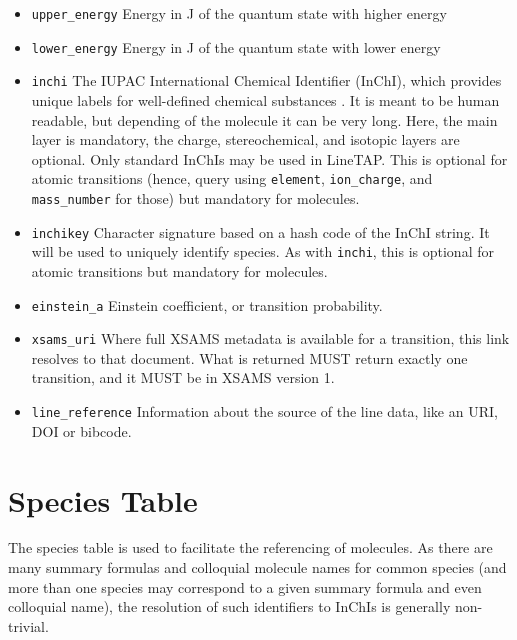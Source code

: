 \documentclass[11pt,a4paper]{ivoa}
\begin{document}
\begin{itemize}
\item \texttt{upper\_energy} Energy  in J of the quantum state
with higher energy

\item \texttt{lower\_energy} Energy  in J of the quantum state
with lower energy

\item \texttt{inchi} The IUPAC International Chemical Identifier
(InChI), which  provides unique labels for well-defined chemical
substances \citep{INCHI}. It is meant to be human readable, but
depending of the molecule it can be very long.  Here, the main layer is
mandatory, the charge, stereochemical, and isotopic layers are optional.
Only standard InChIs may be used in LineTAP.  This is optional for
atomic transitions (hence, query using \texttt{element},
\texttt{ion\_charge}, and \texttt{mass\_number} for those) but mandatory
for molecules.

\item \texttt{inchikey} Character signature based on a hash code of
the InChI string. It will be used to uniquely identify species.  As with
\texttt{inchi}, this is optional for atomic transitions but mandatory
for molecules.

\item \texttt{einstein\_a} Einstein coefficient, or transition probability.

\item \texttt{xsams\_uri} Where full XSAMS metadata is available for a
transition, this link resolves to that document. What is returned MUST
return exactly one transition, and it MUST be in XSAMS version 1.

\item \texttt{line\_reference} Information about the source of the line data,
like an URI, DOI or bibcode.

\end{itemize}

\section{Species Table}\label{sect:speciestable}
\label{ref:speciestable}

The species table is used to facilitate the referencing of molecules. As
there are many summary formulas and colloquial molecule names for common
species (and more than one species may correspond to a given summary
formula and even colloquial name), the resolution of such identifiers to
InChIs is generally non-trivial.
\end{document}
